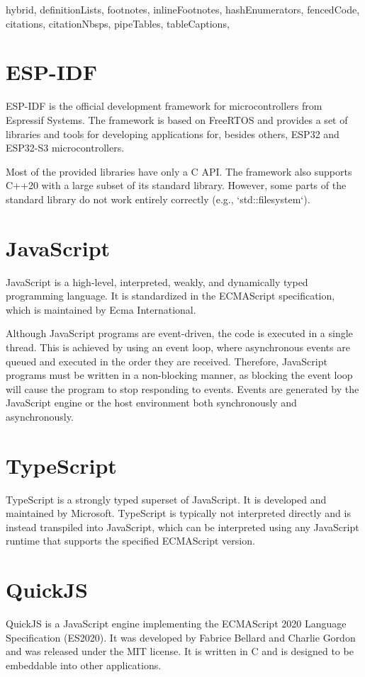\begin{markdown*}{%
  hybrid,
  definitionLists,
  footnotes,
  inlineFootnotes,
  hashEnumerators,
  fencedCode,
  citations,
  citationNbsps,
  pipeTables,
  tableCaptions,
}
\section{ESP-IDF}

ESP-IDF is the official development framework for microcontrollers from Espressif Systems. The framework is based on FreeRTOS and provides a set of libraries and tools for developing applications for, besides others, ESP32 and ESP32-S3 microcontrollers.

Most of the provided libraries have only a C API. The framework also supports C++20 with a large subset of its standard library. However, some parts of the standard library do not work entirely correctly (e.g., `std::filesystem`).

\section{JavaScript}

JavaScript is a high-level, interpreted, weakly, and dynamically typed programming language. It is standardized in the ECMAScript specification, which is maintained by Ecma International.

Although JavaScript programs are event-driven, the code is executed in a single thread. This is achieved by using an event loop, where asynchronous events are queued and executed in the order they are received. Therefore, JavaScript programs must be written in a non-blocking manner, as blocking the event loop will cause the program to stop responding to events. Events are generated by the JavaScript engine or the host environment both synchronously and asynchronously.

\section{TypeScript}

TypeScript is a strongly typed superset of JavaScript. It is developed and maintained by Microsoft. TypeScript is typically not interpreted directly and is instead transpiled into JavaScript, which can be interpreted using any JavaScript runtime that supports the specified ECMAScript version.

\section{QuickJS}

QuickJS\cite{quickjs} is a JavaScript engine implementing the ECMAScript 2020 Language Specification\cite{es2020} (ES2020). It was developed by Fabrice Bellard and Charlie Gordon and was released under the MIT license. It is written in C and is designed to be embeddable into other applications.


\end{markdown*}
